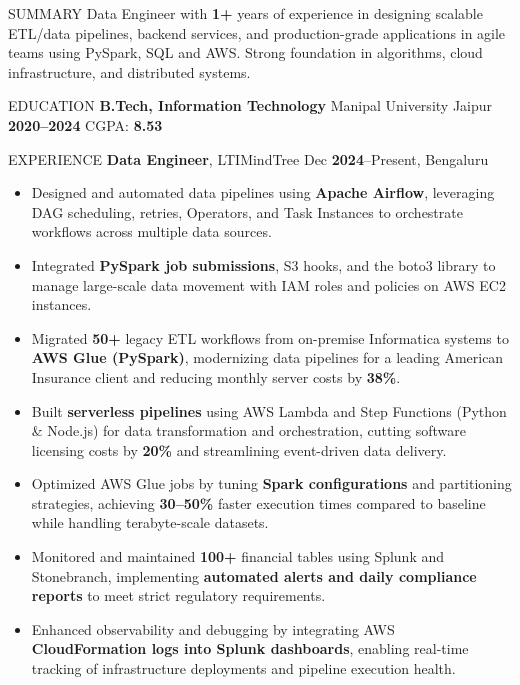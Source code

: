 \documentclass[10pt]{resume}
\begin{document}
\small

\begin{rSection}{SUMMARY}
Data Engineer with \textbf{1+} years of experience in designing scalable ETL/data pipelines, backend services, and production-grade applications in agile teams using PySpark, SQL and AWS. Strong foundation in algorithms, cloud infrastructure, and distributed systems.
\end{rSection}

\begin{rSection}{EDUCATION}
\textbf{B.Tech, Information Technology} \hfill Manipal University Jaipur \\
\textbf{2020--2024} \quad CGPA: \textbf{8.53}
\end{rSection}

\begin{rSection}{EXPERIENCE}
\textbf{Data Engineer}, LTIMindTree \hfill Dec \textbf{2024}–Present, Bengaluru
\begin{itemize}
  \item Designed and automated data pipelines using \textbf{Apache Airflow}, leveraging DAG scheduling, retries, Operators, and Task Instances to orchestrate workflows across multiple data sources.
  \item Integrated \textbf{PySpark job submissions}, S3 hooks, and the boto3 library to manage large-scale data movement with IAM roles and policies on AWS EC2 instances.
  \item Migrated \textbf{50+} legacy ETL workflows from on-premise Informatica systems to \textbf{AWS Glue (PySpark)}, modernizing data pipelines for a leading American Insurance client and reducing monthly server costs by \textbf{38\%}.
  \item Built \textbf{serverless pipelines} using AWS Lambda and Step Functions (Python \& Node.js) for data transformation and orchestration, cutting software licensing costs by \textbf{20\%} and streamlining event-driven data delivery.
  \item Optimized AWS Glue jobs by tuning \textbf{Spark configurations} and partitioning strategies, achieving \textbf{30–50\%} faster execution times compared to baseline while handling terabyte-scale datasets.
  \item Monitored and maintained \textbf{100+} financial tables using Splunk and Stonebranch, implementing \textbf{automated alerts and daily compliance reports} to meet strict regulatory requirements.
  \item Enhanced observability and debugging by integrating AWS \textbf{CloudFormation logs into Splunk dashboards}, enabling real-time tracking of infrastructure deployments and pipeline execution health.

\end{itemize}
\end{rSection}
\end{document}
